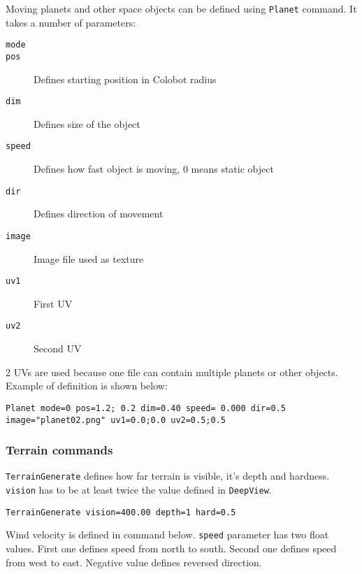 Moving planets and other space objects can be defined using \texttt{Planet} command. It takes a number of parameters:


\begin{description}
    \item[\texttt{mode}] 
    \item[\texttt{pos}] Defines starting position in Colobot radius
    \item[\texttt{dim}] Defines size of the object
    \item[\texttt{speed}] Defines how fast object is moving, 0 means static object
    \item[\texttt{dir}] Defines direction of movement
    \item[\texttt{image}] Image file used as texture
    \item[\texttt{uv1}] First UV
    \item[\texttt{uv2}] Second UV
\end{description}

2 UVs are used because one file can contain multiple planets or other objects. Example of definition is shown below:

\begin{lstlisting}[style=scene]
Planet mode=0 pos=1.2; 0.2 dim=0.40 speed= 0.000 dir=0.5 image="planet02.png" uv1=0.0;0.0 uv2=0.5;0.5
\end{lstlisting}


\subsubsection{Terrain commands}

\texttt{TerrainGenerate} defines how far terrain is visible, it's depth and hardness. \texttt{vision} has to be at least twice the value defined in \texttt{DeepView}.

\begin{lstlisting}[style=scene]
TerrainGenerate vision=400.00 depth=1 hard=0.5
\end{lstlisting}

Wind velocity is defined in command below. \texttt{speed} parameter has two float values. First one defines speed from north to south. Second one defines speed from west to east. Negative value defines reversed direction.


